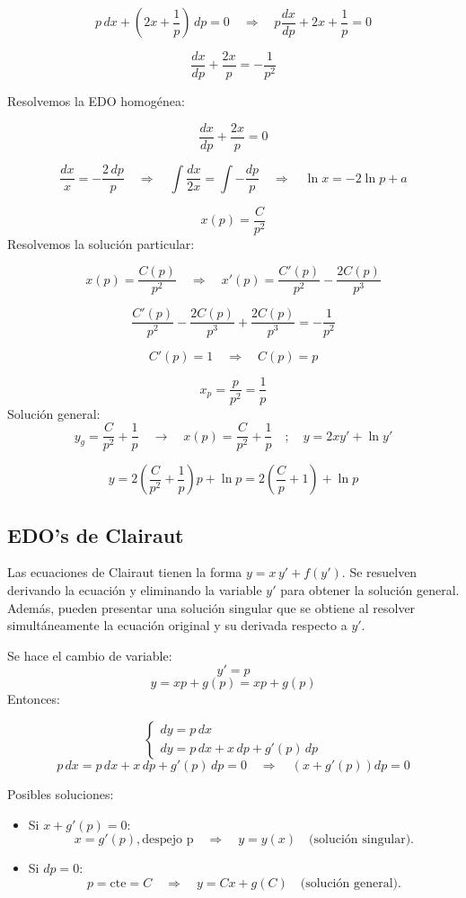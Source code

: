 \documentclass[a4paper,12pt]{article}
\begin{document}
\[
p\, dx + (2x + \frac{1}{p})\, dp = 0 \quad \Rightarrow \quad p\frac{dx}{dp} + 2x + \frac{1}{p} = 0
\]

\[
\frac{dx}{dp} + \frac{2x}{p} = -\frac{1}{p^2}
\]

\newpage
\noindent
Resolvemos la EDO homogénea:

\[
\frac{dx}{dp} + \frac{2x}{p} = 0
\]

\[
\frac{dx}{x} = -\frac{2\, dp}{p} 
\quad \Rightarrow \quad 
\int \frac{dx}{2x} = \int -\frac{dp}{p}
\quad \Rightarrow \quad 
\ln x = -2 \ln p + a 
\]

\[
x(p) = \frac{C}{p^2}
\]
Resolvemos la solución particular:

\[
x(p) = \frac{C(p)}{p^2} \quad \Rightarrow \quad x'(p) = \frac{C'(p)}{p^2} - \frac{2C(p)}{p^3}
\]

\[
\frac{C'(p)}{p^2} - \frac{2C(p)}{p^3} + \frac{2C(p)}{p^3} = -\frac{1}{p^2}
\]

\[
C'(p) = 1 \quad \Rightarrow \quad C(p) = p
\]

\[
x_p = \frac{p}{p^2} = \frac{1}{p}
\]
Solución general:
\[
y_g = \frac{C}{p^2} + \frac{1}{p} \quad \rightarrow \quad x(p) = \frac{C}{p^2} + \frac{1}{p}
\quad ; \quad y = 2xy' + \ln y'
\]

\[
y = 2 \left( \frac{C}{p^2} + \frac{1}{p} \right) p + \ln p = 2 \left( \frac{C}{p} + 1 \right) + \ln p
\]

\subsection{EDO's de Clairaut}
\noindent
Las ecuaciones de Clairaut tienen la forma $y = x\,y' + f(y')$. 
Se resuelven derivando la ecuación y eliminando la variable $y'$ para obtener la solución general. 
Además, pueden presentar una solución singular que se obtiene al resolver simultáneamente 
la ecuación original y su derivada respecto a $y'$.

\newpage
\noindent
Se hace el cambio de variable:
\[
y' = p
\]
\[
y = xp + g(p) = xp + g(p)
\]
Entonces:

\[
\begin{cases}
dy = p\, dx \\[6pt]
dy = p\, dx + x\, dp + g'(p)\, dp
\end{cases}
\]
\medskip
\[
p\, dx = p\, dx + x\, dp + g'(p)\, dp = 0 \quad \Rightarrow \quad (x + g'(p)) dp = 0
\]

\medskip
\noindent
Posibles soluciones:
\medskip
\begin{itemize}
  \item Si $x + g'(p) = 0$:
  \[
  x = g'(p), \text{despejo p} \quad\Rightarrow\quad y = y(x) \quad \text{(solución singular)}.
  \]
  \item Si $dp = 0$: 
  \[
  p = \text{cte} = C \quad\Rightarrow\quad y = Cx + g(C) \quad \text{(solución general)}.
  \]
\end{itemize}
\end{document}

